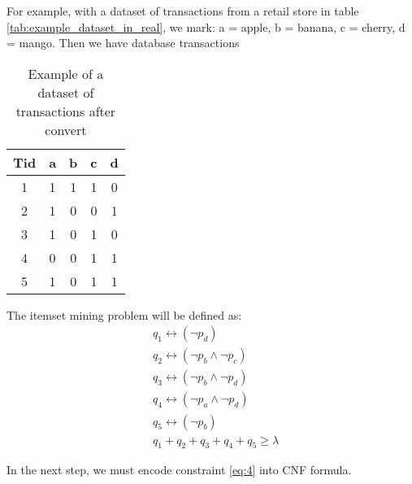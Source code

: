 For example, with a dataset of transactions from a retail store in table \ref{tab:example_dataset_in_real}, we mark:
a = apple, b = banana, c = cherry, d = mango. Then we have database transactions

\begin{table}[H]
    \centering
    \begin{tabular}{|c| c c c c |}
        \hline
        \textbf{Tid} & \textbf{a} & \textbf{b} & \textbf{c} & \textbf{d} \\
        \hline
        1            & 1          & 1          & 1          & 0          \\
        2            & 1          & 0          & 0          & 1          \\
        3            & 1          & 0          & 1          & 0          \\
        4            & 0          & 0          & 1          & 1          \\
        5            & 1          & 0          & 1          & 1          \\
        \hline
    \end{tabular}
    \caption{Example of a dataset of transactions after convert}
    \label{tab:example_dataset_after_convert}
\end{table}

The itemset mining problem will be defined as:
\begin{equation*}
    \begin{aligned}
         & q_1 \leftrightarrow (\neg p_d                ) \\
         & q_2 \leftrightarrow (\neg p_b \wedge \neg p_c) \\
         & q_3 \leftrightarrow (\neg p_b \wedge \neg p_d) \\
         & q_4 \leftrightarrow (\neg p_a \wedge \neg p_d) \\
         & q_5 \leftrightarrow (\neg p_b                ) \\
         & q_1 + q_2 + q_3 + q_4 + q_5 \geq \lambda
    \end{aligned}
\end{equation*}

In the next step, we must encode constraint \ref{eq:4} into CNF formula.
